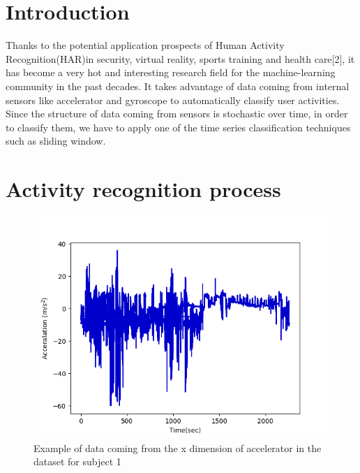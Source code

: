 \section{Introduction}
Thanks to the potential application prospects of Human Activity Recognition(HAR)in security, virtual reality, sports training and health care[2], it has become a very hot and interesting research field for the machine-learning community in the past decades. It takes advantage of data coming from internal sensors like accelerator and gyroscope to automatically classify user activities. Since the structure of data coming from sensors is stochastic over time, in order to classify them, we have to apply one of the time series classification techniques such as sliding window.

\section{Activity recognition process}
\begin{figure}[h]
    \centering
    \includegraphics[width=.4\textwidth]{Figures/signal.png}
    \caption{Example of data coming from the x dimension of accelerator in the dataset for subject 1  }
    \label{fig:signal}
\end{figure}

